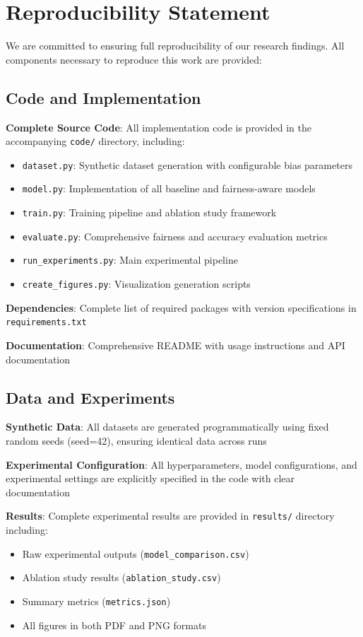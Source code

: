 \section*{Reproducibility Statement}

We are committed to ensuring full reproducibility of our research findings. All components necessary to reproduce this work are provided:

\subsection*{Code and Implementation}

\textbf{Complete Source Code}: All implementation code is provided in the accompanying \texttt{code/} directory, including:
\begin{itemize}
\item \texttt{dataset.py}: Synthetic dataset generation with configurable bias parameters
\item \texttt{model.py}: Implementation of all baseline and fairness-aware models
\item \texttt{train.py}: Training pipeline and ablation study framework
\item \texttt{evaluate.py}: Comprehensive fairness and accuracy evaluation metrics
\item \texttt{run\_experiments.py}: Main experimental pipeline
\item \texttt{create\_figures.py}: Visualization generation scripts
\end{itemize}

\textbf{Dependencies}: Complete list of required packages with version specifications in \texttt{requirements.txt}

\textbf{Documentation}: Comprehensive README with usage instructions and API documentation

\subsection*{Data and Experiments}

\textbf{Synthetic Data}: All datasets are generated programmatically using fixed random seeds (seed=42), ensuring identical data across runs

\textbf{Experimental Configuration}: All hyperparameters, model configurations, and experimental settings are explicitly specified in the code with clear documentation

\textbf{Results}: Complete experimental results are provided in \texttt{results/} directory including:
\begin{itemize}
\item Raw experimental outputs (\texttt{model\_comparison.csv})
\item Ablation study results (\texttt{ablation\_study.csv})
\item Summary metrics (\texttt{metrics.json})
\item All figures in both PDF and PNG formats
\end{itemize}

